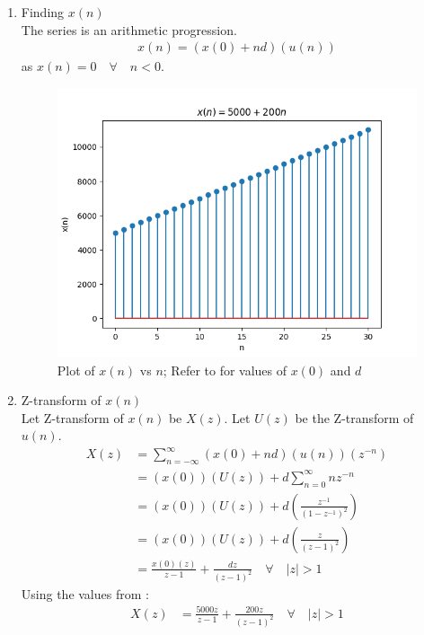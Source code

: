 \documentclass[journal,12pt,twocolumn]{IEEEtran}
\theoremstyle{remark}
\begin{document}
\begin{enumerate}
\item Finding $x(n)$ \\
The series is an arithmetic progression.
\begin{align}
x(n) = (x(0) + nd)(u(n))
\end{align}
as $x(n) = 0 \quad \forall \quad n < 0$.
\begin{figure}[h!]
    \centering
    \includegraphics[width=\columnwidth]{figs/10_5_2_19.png}
    \caption{Plot of $x(n)$ vs $n$; Refer to  for values of $x(0)$ and $d$}
    \label{fig:1}
\end{figure}
\item Z-transform of $x(n)$ \\
Let Z-transform of $x(n)$ be $X(z)$. Let $U(z)$ be the Z-transform of $u(n)$.
\begin{align}
X(z) &= \sum_{n = -\infty}^{\infty} (x(0) + nd)(u(n))(z^{-n}) \\
&= (x(0))(U(z)) + d\sum_{n = 0}^{\infty}nz^{-n} \\
&= (x(0))(U(z)) + d(\frac{z^{-1}}{(1 - z^{-1})^2}) \\
&= (x(0))(U(z)) + d(\frac{z}{(z - 1)^2}) \\
&= \frac{x(0)(z)}{z - 1} + \frac{dz}{(z - 1)^2} \quad \forall \quad |z| > 1
\end{align}
Using the values from :
\begin{align}
X(z) &= \frac{5000z}{z - 1} + \frac{200z}{(z - 1)^2} \quad \forall \quad |z| > 1
\end{align}
\end{enumerate}
\end{document}
